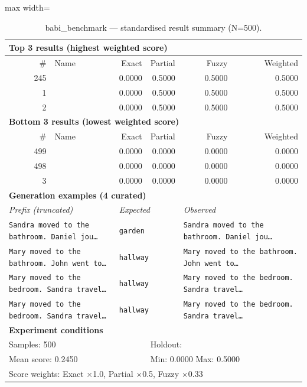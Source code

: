 \begin{table}[htbp]
\centering
\caption{babi\_benchmark — standardised result summary (N=500).}
\label{tab:babi_benchmark_summary}
\begin{adjustbox}{max width=\textwidth}
\begin{tabular}{r p{5cm} r r r r}
\toprule
\multicolumn{6}{l}{\textbf{Top 3 results (highest weighted score)}} \\
\midrule
\# & Name & Exact & Partial & Fuzzy & Weighted \\
\midrule
245 &  & 0.0000 & 0.5000 & 0.5000 & 0.5000 \\
1 &  & 0.0000 & 0.5000 & 0.5000 & 0.5000 \\
2 &  & 0.0000 & 0.5000 & 0.5000 & 0.5000 \\
\midrule
\multicolumn{6}{l}{\textbf{Bottom 3 results (lowest weighted score)}} \\
\midrule
\# & Name & Exact & Partial & Fuzzy & Weighted \\
\midrule
499 &  & 0.0000 & 0.0000 & 0.0000 & 0.0000 \\
498 &  & 0.0000 & 0.0000 & 0.0000 & 0.0000 \\
3 &  & 0.0000 & 0.0000 & 0.0000 & 0.0000 \\
\midrule
\multicolumn{6}{l}{\textbf{Generation examples (4 curated)}} \\
\midrule
\multicolumn{2}{l}{\textit{Prefix (truncated)}} & \multicolumn{2}{l}{\textit{Expected}} & \multicolumn{2}{l}{\textit{Observed}} \\
\midrule
\multicolumn{2}{l}{\texttt{Sandra moved to the bathroom. Daniel jou\ldots}} & \multicolumn{2}{l}{\texttt{garden}} & \multicolumn{2}{l}{\texttt{Sandra moved to the bathroom. Daniel jou\ldots}} \\
\multicolumn{2}{l}{\texttt{Mary moved to the bathroom. John went to\ldots}} & \multicolumn{2}{l}{\texttt{hallway}} & \multicolumn{2}{l}{\texttt{Mary moved to the bathroom. John went to\ldots}} \\
\multicolumn{2}{l}{\texttt{Mary moved to the bedroom. Sandra travel\ldots}} & \multicolumn{2}{l}{\texttt{hallway}} & \multicolumn{2}{l}{\texttt{Mary moved to the bedroom. Sandra travel\ldots}} \\
\multicolumn{2}{l}{\texttt{Mary moved to the bedroom. Sandra travel\ldots}} & \multicolumn{2}{l}{\texttt{hallway}} & \multicolumn{2}{l}{\texttt{Mary moved to the bedroom. Sandra travel\ldots}} \\
\midrule
\multicolumn{6}{l}{\textbf{Experiment conditions}} \\
\midrule
\multicolumn{3}{l}{Samples: 500} & \multicolumn{3}{l}{Holdout: } \\
\multicolumn{3}{l}{Mean score: 0.2450} & \multicolumn{3}{l}{Min: 0.0000 \quad Max: 0.5000} \\
\multicolumn{6}{l}{Score weights: Exact $\times$1.0, Partial $\times$0.5, Fuzzy $\times$0.33} \\
\bottomrule
\end{tabular}
\end{adjustbox}
\end{table}
